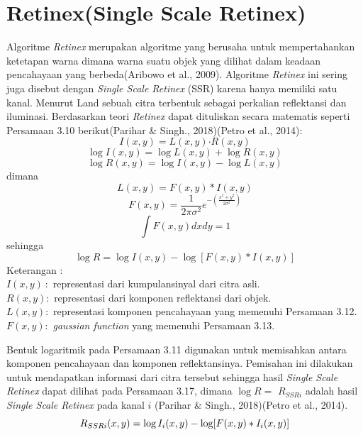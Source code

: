 \section{Retinex(Single Scale Retinex)}
Algoritme \emph{Retinex} merupakan algoritme yang berusaha untuk mempertahankan ketetapan warna dimana warna suatu objek yang dilihat dalam keadaan pencahayaan yang berbeda(Aribowo et al., 2009). Algoritme \emph{Retinex} ini sering juga disebut dengan \emph{Single Scale Retinex} (SSR) karena hanya memiliki satu kanal. Menurut Land sebuah citra terbentuk sebagai perkalian reflektansi dan iluminasi. Berdasarkan teori \emph{Retinex} dapat dituliskan secara matematis seperti Persamaan 3.10 berikut(Parihar \& Singh., 2018)(Petro et al., 2014):
\begin{equation}
	I(x,y) = L(x,y) \boldsymbol{\cdot} R(x,y)
\end{equation}
\begin{equation}
	\log I(x,y) = \log L(x,y) + \log R(x,y)
\end{equation}
\begin{equation}
	\log R(x,y) = \log I(x,y)-\log L(x,y)
\end{equation}
dimana
\begin{equation}
	L(x,y)=F(x,y) * I(x,y)
\end{equation}
\begin{equation}
F(x,y) = \frac{1}{2\pi \sigma^2}e^{-(\frac{x^2 + y^2}{2\sigma^2})}
\end{equation}
\begin{equation}
	\int F(x,y) dxdy = 1
\end{equation}
sehingga
\begin{equation}
\log R = \log I(x,y) - \log [F(x,y) * I(x,y)]
\end{equation}
Keterangan :\\
\(I(x,y) \ :\) representasi dari kumpulansinyal dari citra asli.\\
\(R(x,y) :\) representasi dari komponen reflektansi dari objek.\\
\(L(x,y) :\) representasi komponen pencahayaan yang memenuhi Persamaan 3.12.\\
\(F(x,y) : \) \emph{gaussian function} yang memenuhi Persamaan 3.13.

Bentuk logaritmik pada Persamaan 3.11 digunakan untuk memisahkan antara komponen pencahayaan dan komponen reflektansinya. Pemisahan ini dilakukan untuk mendapatkan informasi dari citra tersebut sehingga hasil \emph{Single Scale Retinex} dapat dilihat pada Persamaan 3.17, dimana $\log R =$ \(R_{SSRi}\) adalah hasil \emph{Single Scale Retinex} pada kanal \(i\) (Parihar \& Singh., 2018)(Petro et al., 2014).
\begin{equation}
\centering
R_{SSRi}(x,y) = \log I_i(x,y) - \log [F(x,y) * I_i(x,y)]
\end{equation}
